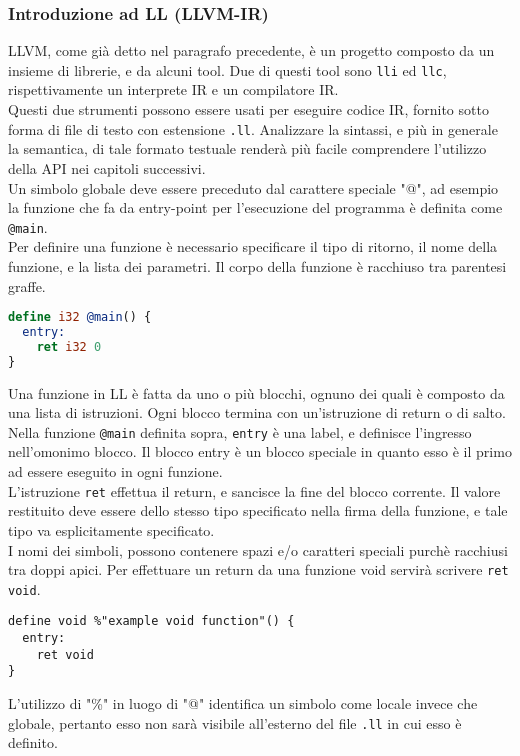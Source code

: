 \subsubsection{Introduzione ad LL (LLVM-IR)}
LLVM, come già detto nel paragrafo precedente, è un progetto composto da un 
insieme di librerie, e da alcuni tool. Due di questi tool sono \texttt{lli} ed 
\texttt{llc}, rispettivamente un interprete IR e un compilatore IR. \\

Questi due strumenti possono essere usati per eseguire codice IR, fornito 
sotto forma di file di testo con estensione \texttt{.ll}. Analizzare la sintassi, 
e più in generale la semantica, di tale formato testuale renderà più facile comprendere 
l'utilizzo della API nei capitoli successivi. \\

Un simbolo globale deve essere preceduto dal carattere speciale "@", ad 
esempio la funzione che fa da entry-point per l'esecuzione del programma 
è definita come \texttt{@main}. \\ 

Per definire una funzione è necessario specificare il tipo di ritorno, il 
nome della funzione, e la lista dei parametri. Il corpo della funzione 
è racchiuso tra parentesi graffe. \\ 

\begin{lstlisting}[frame=single, language=LLVM]
define i32 @main() {
  entry:
    ret i32 0
}
\end{lstlisting}
\vspace{0.5cm}

Una funzione in LL è fatta da uno o più blocchi, ognuno dei quali è composto da 
una lista di istruzioni. Ogni blocco termina con un'istruzione di return o di salto. 
Nella funzione \texttt{@main} definita sopra, \texttt{entry} è una label, e definisce 
l'ingresso nell'omonimo blocco. Il blocco entry è un blocco speciale in quanto esso è 
il primo ad essere eseguito in ogni funzione. \\

L'istruzione \texttt{ret} effettua il return, e sancisce la fine del blocco 
corrente. Il valore restituito deve essere dello stesso tipo specificato nella 
firma della funzione, e tale tipo va esplicitamente specificato. \\

I nomi dei simboli, possono contenere spazi e/o caratteri speciali purchè
racchiusi tra doppi apici. Per effettuare un return da una funzione void 
servirà scrivere \texttt{ret void}. \\

\begin{lstlisting}[frame=single]
define void %"example void function"() {
  entry:
    ret void
}
\end{lstlisting}
\vspace{0.5cm}

L'utilizzo di "\%" in luogo di "@" identifica un simbolo come locale invece che globale, pertanto 
esso non sarà visibile all'esterno del file \texttt{.ll} in cui esso è definito.